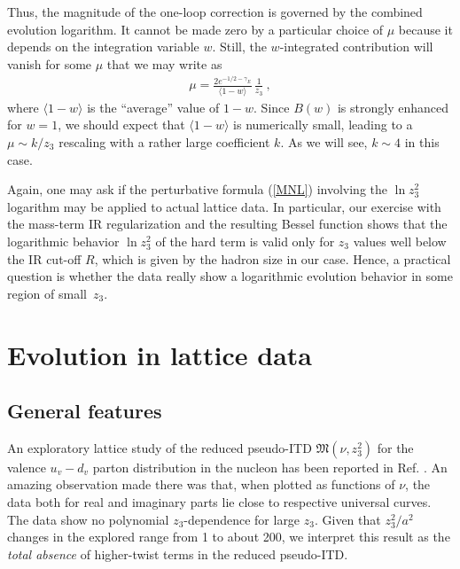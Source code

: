 \documentclass[aps,prd,twocolumn,showpacs,preprintnumbers,superscriptaddress]{revtex4-1}
\begin{document}
 Thus, the magnitude 
 of the one-loop correction is governed by the combined evolution logarithm.
 It cannot be made zero by a particular choice of $\mu$  because
 it depends on the integration variable $w$.
 Still,   the $w$-integrated contribution will vanish for some $\mu$   that 
 we may write as 
     \begin{align} 
\mu =  \frac{2 e^{-1/2-\gamma_E}}{\langle 1-w \rangle   }\, \frac1{z_3} \ , 
\end{align}
    where $\langle 1-w \rangle $  is the ``average''  value of $1-w$.
    Since $B(w)$  is strongly enhanced for $w=1$, we should expect
    that $\langle 1-w \rangle $ is  numerically small,
    leading to a $\mu \sim k/z_3$ rescaling with a  rather large coefficient $k$.
 As we will see, $k \sim 4$ in this case. 

    
  Again, one may  ask  if 
the perturbative formula (\ref{MNL})  involving the 
$\ln  z_3^2 $ logarithm may be applied to  actual   lattice data. 
 In particular, our exercise with the mass-term IR regularization 
 and the  resulting  Bessel function shows 
 that 
 the logarithmic behavior $\ln z_3^2 $ 
of the hard term is valid   only for $z_3 $  values well   below 
the IR cut-off $R$, which is given by  the hadron size in our case. 
Hence, a practical question is whether 
  the data  really 
show a logarithmic evolution behavior  in some region of  \mbox{small $z_3$. }

  
  






 
  

\section{Evolution in   lattice data}

\subsection{General features} 
  
 An exploratory  lattice study 
 of the reduced pseudo-ITD  ${\mathfrak M} (\nu, z_3^2)$
 for the valence $u_v-d_v$ parton distribution in the nucleon has  been reported in Ref.
 \cite{Orginos:2017kos}.  
 An amazing observation made there was that, 
 when plotted as functions of $\nu$, the data both for real
 and imaginary  parts lie close to respective universal curves.
 The data  
 show no polynomial $z_3$-dependence for large $z_3$.
 Given that $z_3^2/a^2$ changes in the explored  range
 from 1 to about 200, we  interpret this result as the  {\it  total 
 absence}  of higher-twist terms in the reduced
 pseudo-ITD.
 
\end{document}
